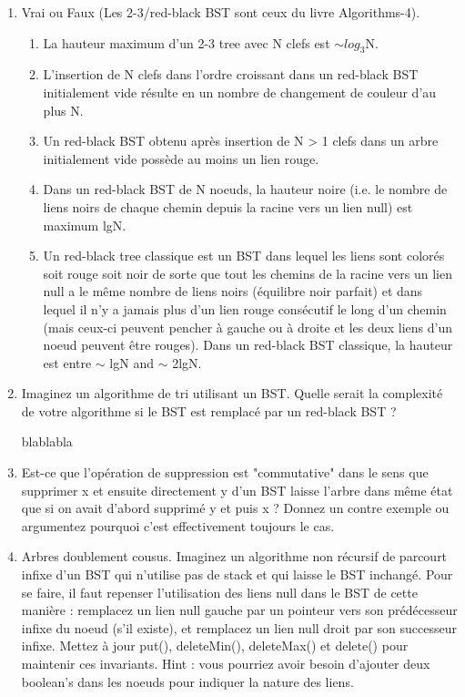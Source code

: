 \documentclass[11pt]{article}
\begin{document}
\begin{enumerate}
\begin{enumerate}
{\color{dkgreen}  }
\end{enumerate}

\item Vrai ou Faux (Les 2-3/red-black BST sont ceux du livre Algorithms-4).
\begin{enumerate}
\item La hauteur maximum d'un 2-3 tree avec N clefs est $\sim log_3$N.\\

{\color{dkgreen}  }

\item L'insertion de N clefs dans l'ordre croissant dans un red-black BST initialement
vide résulte en un nombre de changement de couleur d'au plus N.\\

\item Un red-black BST obtenu après insertion de N > 1 clefs dans un arbre initialement
vide possède au moins un lien rouge.\\

\item Dans un red-black BST de N noeuds, la hauteur noire (i.e. le nombre de liens
noirs de chaque chemin depuis la racine vers un lien null) est maximum lgN.\\

\item Un red-black tree classique est un BST dans lequel les liens sont colorés soit
rouge soit noir de sorte que tout les chemins de la racine vers un lien null a
le même nombre de liens noirs (équilibre noir parfait) et dans lequel il n'y
a jamais plus d'un lien rouge consécutif le long d'un chemin (mais ceux-ci
peuvent pencher à gauche ou à droite et les deux liens d'un noeud peuvent
être rouges). Dans un red-black BST classique, la hauteur est entre $\sim$ lgN
and $\sim$ 2lgN.
\end{enumerate}
\item Imaginez un algorithme de tri utilisant un BST. Quelle serait la complexité de
votre algorithme si le BST est remplacé par un red-black BST ?

blablabla
\item Est-ce que l’opération de suppression est "commutative" dans le sens que supprimer
x et ensuite directement y d’un BST laisse l’arbre dans même état que si on
avait d’abord supprimé y et puis x ? Donnez un contre exemple ou argumentez
pourquoi c’est effectivement toujours le cas.
\item Arbres doublement cousus. Imaginez un algorithme non récursif de parcourt infixe
d’un BST qui n’utilise pas de stack et qui laisse le BST inchangé. Pour se faire, il
faut repenser l’utilisation des liens null dans le BST de cette manière : remplacez
un lien null gauche par un pointeur vers son prédécesseur infixe du noeud
(s’il existe), et remplacez un lien null droit par son successeur infixe. Mettez
à jour put(), deleteMin(), deleteMax() et delete() pour maintenir
ces invariants. Hint : vous pourriez avoir besoin d’ajouter deux boolean’s dans
les noeuds pour indiquer la nature des liens.
\end{enumerate}
\end{document}
